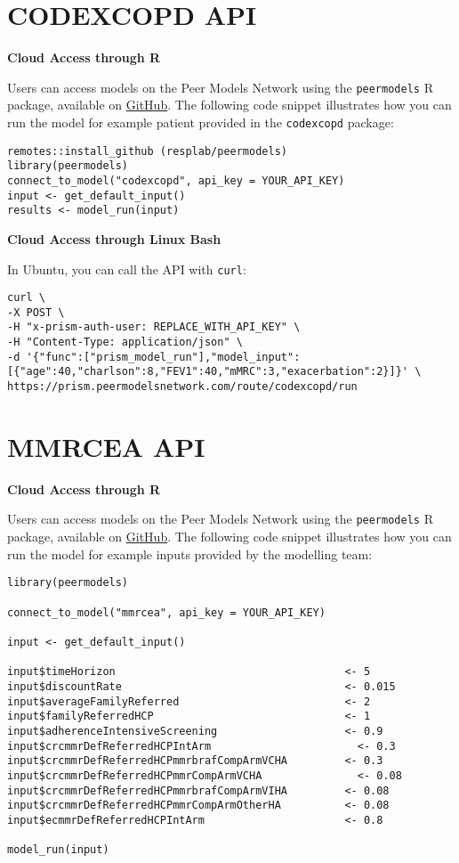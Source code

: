 \documentclass[
]{book}
\begin{document}
\hypertarget{codexcopd-api}{%
\section{CODEXCOPD API}\label{codexcopd-api}}

\textbf{Cloud Access through R}

Users can access models on the Peer Models Network using the \texttt{peermodels} R package, available on \href{https://github.com/resplab/peermodels}{GitHub}. The following code snippet illustrates how you can run the model for example patient provided in the \texttt{codexcopd} package:

\begin{verbatim}
remotes::install_github (resplab/peermodels)
library(peermodels)
connect_to_model("codexcopd", api_key = YOUR_API_KEY)
input <- get_default_input()
results <- model_run(input)
\end{verbatim}

\textbf{Cloud Access through Linux Bash}

In Ubuntu, you can call the API with \texttt{curl}:

\begin{verbatim}
curl \
-X POST \
-H "x-prism-auth-user: REPLACE_WITH_API_KEY" \
-H "Content-Type: application/json" \
-d '{"func":["prism_model_run"],"model_input":[{"age":40,"charlson":8,"FEV1":40,"mMRC":3,"exacerbation":2}]}' \
https://prism.peermodelsnetwork.com/route/codexcopd/run
\end{verbatim}

\hypertarget{mmrcea-api}{%
\section{MMRCEA API}\label{mmrcea-api}}

\textbf{Cloud Access through R}

Users can access models on the Peer Models Network using the \texttt{peermodels} R package, available on \href{https://github.com/resplab/peermodels}{GitHub}. The following code snippet illustrates how you can run the model for example inputs provided by the modelling team:

\begin{verbatim}
library(peermodels)

connect_to_model("mmrcea", api_key = YOUR_API_KEY)

input <- get_default_input()

input$timeHorizon                                    <- 5
input$discountRate                                   <- 0.015
input$averageFamilyReferred                          <- 2       
input$familyReferredHCP                              <- 1     
input$adherenceIntensiveScreening                    <- 0.9      
input$crcmmrDefReferredHCPIntArm	                   <- 0.3   
input$crcmmrDefReferredHCPmmrbrafCompArmVCHA         <-	0.3   
input$crcmmrDefReferredHCPmmrCompArmVCHA	           <- 0.08  
input$crcmmrDefReferredHCPmmrbrafCompArmVIHA         <- 0.08  
input$crcmmrDefReferredHCPmmrCompArmOtherHA	         <- 0.08  
input$ecmmrDefReferredHCPIntArm	                     <- 0.8   

model_run(input)
\end{verbatim}
\end{document}
